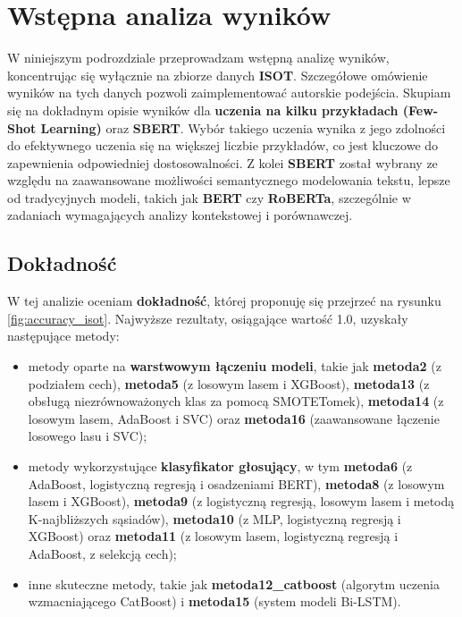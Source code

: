 \section{Wstępna analiza wyników}
\label{text:results}

W niniejszym podrozdziale przeprowadzam wstępną analizę wyników, koncentrując się wyłącznie na zbiorze danych \textbf{ISOT}. Szczegółowe omówienie wyników na tych danych pozwoli zaimplementować autorskie podejścia. Skupiam się na dokładnym opisie wyników dla \textbf{uczenia na kilku przykładach (Few-Shot Learning)} oraz \textbf{SBERT}. Wybór takiego uczenia wynika z jego zdolności do efektywnego uczenia się na większej liczbie przykładów, co jest kluczowe do zapewnienia odpowiedniej dostosowalności. Z kolei \textbf{SBERT} został wybrany ze względu na zaawansowane możliwości semantycznego modelowania tekstu, lepsze od tradycyjnych modeli, takich jak \textbf{BERT} czy \textbf{RoBERTa}, szczególnie w zadaniach wymagających analizy kontekstowej i porównawczej.

\subsection{Dokładność}
W tej analizie oceniam \textbf{dokładność}, której proponuję się przejrzeć na rysunku \ref{fig:accuracy_isot}. Najwyższe rezultaty, osiągające wartość 1.0, uzyskały następujące metody:
\begin{itemize}
	\item metody oparte na \textbf{warstwowym łączeniu modeli}, takie jak \textbf{metoda2} (z podziałem cech), \textbf{metoda5} (z losowym lasem i XGBoost), \textbf{metoda13} (z obsługą niezrównoważonych klas za pomocą SMOTETomek), \textbf{metoda14} (z losowym lasem, AdaBoost i SVC) oraz \textbf{metoda16} (zaawansowane łączenie losowego lasu i SVC);
	\item metody wykorzystujące \textbf{klasyfikator głosujący}, w tym \textbf{metoda6} (z AdaBoost, logistyczną regresją i osadzeniami BERT), \textbf{metoda8} (z losowym lasem i XGBoost), \textbf{metoda9} (z logistyczną regresją, losowym lasem i metodą K-najbliższych sąsiadów), \textbf{metoda10} (z MLP, logistyczną regresją i XGBoost) oraz \textbf{metoda11} (z losowym lasem, logistyczną regresją i AdaBoost, z selekcją cech);
	\item inne skuteczne metody, takie jak \textbf{metoda12\_catboost} (algorytm uczenia wzmacniającego CatBoost) i \textbf{metoda15} (system modeli Bi-LSTM).
\end{itemize}

